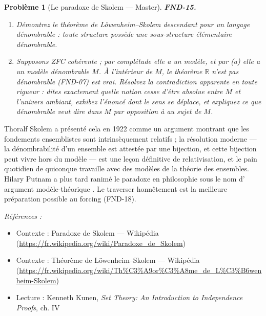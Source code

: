 \documentclass[11pt]{article}
\newtheorem{problem}{Problème}
\newenvironment{refs}{\par\small\noindent\emph{Références :}\begin{itemize}\setlength\itemsep{0pt}}{\end{itemize}\normalsize}
\begin{document}
\bigskip

\begin{problem}[{Le paradoxe de Skolem --- Master}]
\textbf{FND-15.} \begin{enumerate}
\item[(a)] Démontrez le théorème de Löwenheim--Skolem descendant pour un
langage dénombrable : toute structure possède une sous-structure élémentaire dénombrable.
\item[(b)] Supposons ZFC cohérente ; par complétude elle a un modèle, et par (a) elle a un modèle
dénombrable $ M $. À l'intérieur de $ M $, le théorème \og{} $\mathbb{R}$ n'est pas dénombrable \fg{} (FND-07)
est vrai. Résolvez la contradiction apparente en toute rigueur : dites exactement quelle notion
cesse d'être absolue entre $ M $ et l'univers ambiant, exhibez l'énoncé dont le sens se déplace,
et expliquez ce que \og{} dénombrable \fg{} veut dire \textit{dans} $ M $ par opposition à \textit{au sujet
de} $ M $.
\end{enumerate}

\end{problem}

\noindent Thoralf Skolem a présenté cela en 1922 comme un argument montrant que les
fondements ensemblistes sont intrinsèquement relatifs ; la résolution moderne --- la dénombrabilité
d'un ensemble est attestée par une bijection, et cette bijection peut vivre hors du modèle --- est
une leçon définitive de relativisation, et le pain quotidien de quiconque travaille avec des
modèles de la théorie des ensembles. Hilary Putnam a plus tard ranimé le paradoxe en philosophie
sous le nom d'\og{} argument modèle-théorique \fg{}. Le traverser honnêtement est la meilleure préparation
possible au forcing (FND-18).

\begin{refs}
\item Contexte : Paradoxe de Skolem --- Wikipédia (\url{https://fr.wikipedia.org/wiki/Paradoxe_de_Skolem})
\item Contexte : Théorème de Löwenheim--Skolem --- Wikipédia (\url{https://fr.wikipedia.org/wiki/Th%C3%A9or%C3%A8me_de_L%C3%B6wenheim-Skolem})
\item Lecture : Kenneth Kunen, \textit{Set Theory: An Introduction to Independence Proofs}, ch. IV
\end{refs}

\bigskip
\end{document}
